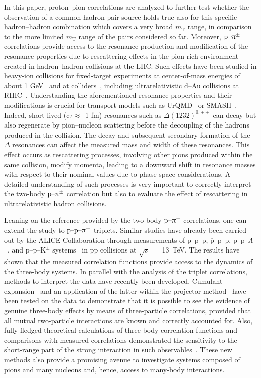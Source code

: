 \documentclass[ALICE,manyauthors]{cernphprep}
\begin{document}
In this paper, proton--pion correlations are analyzed to further test whether the observation of a common hadron-pair source holds true also for this specific hadron--hadron combination which covers a very broad $m_\text{T}$ range, in comparison to the more limited $m_\text{T}$ range of the pairs considered so far. Moreover, $\text{p--}\uppi^\pm$ correlations provide access to the resonance production and modification of the resonance properties due to rescattering effects in the pion-rich environment created in hadron--hadron collisions at the LHC. Such effects have been studied in heavy-ion collisions for fixed-target experiments at center-of-mass energies of about 1 GeV~\cite{Reichert:2019lny,Reichert:2022uha,Adamczewski-Musch:2020edy} and at colliders~\cite{ALICE:2023edr}, including ultrarelativistic d--Au collisions at RHIC~\cite{STAR:2008twt}. Understanding the aforementioned resonance properties and their modifications is crucial for transport models such as UrQMD~\cite{Bass:1998ca, Bleicher:1999xi} or SMASH~\cite{Petersen:2018jag}. Indeed, short-lived (c$\tau \approx\,$ 1 fm) resonances such as $\Delta(1232)^{0,++}$ can decay but also regenerate by pion--nucleon scattering before the decoupling of the hadrons produced in the collision. The decay and subsequent secondary formation of the $\Delta$ resonances can affect the measured mass and width of these resonances. This effect occurs as rescattering processes, involving other pions produced within the same collision, modify momenta, leading to a downward shift in resonance masses with respect to their nominal values due to phase space considerations.
A detailed understanding of such processes is very important to correctly interpret the two-body $\text{p--}\uppi^\pm$ correlation but also to evaluate the effect of rescattering in ultrarelativistic hadron collisions.

Leaning on the reference provided by the two-body $\text{p--}\uppi^\pm$ correlations, one can extend the study to $\text{p--p--}\uppi^\pm$ triplets. Similar studies have already been carried out by the ALICE Collaboration through measurements of p--p--p, $\overline{\text{p}}$--p--p, p--p--$\Lambda$~\cite{ALICE:ppp-ppL}, and p--p--$\mathrm{K}^{\pm}$ systems~\cite{ALICE:ppK} in pp collisions at $\sqrt{s}$~=~13~TeV. The results have shown that the measured correlation functions provide access to the dynamics of the three-body systems.
In parallel with the analysis of the triplet correlations, methods to interpret the data have recently been developed. Cumulant expansion~\cite{Kubo,ALICE:3pi} and an application of the latter within the projector method~\cite{DelGrande:2021mju} have been tested on the data to demonstrate that it is possible to see the evidence of genuine three-body effects by means of three-particle correlations, provided that all mutual two-particle interactions are known and correctly accounted for. Also, fully-fledged theoretical calculations of three-body correlation functions and comparisons with measured correlations demonstrated the sensitivity to the short-range part of the strong interaction in such observables~\cite{KievskyThreeBody}.
These new methods also provide a promising avenue to investigate systems composed of pions and many nucleons and, hence, access to many-body interactions.
\end{document}
